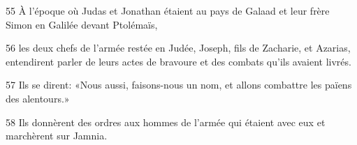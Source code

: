 55 À l’époque où Judas et Jonathan étaient au pays de Galaad et leur frère Simon en Galilée devant Ptolémaïs,

56 les deux chefs de l’armée restée en Judée, Joseph, fils de Zacharie, et Azarias, entendirent parler de leurs actes de bravoure et des combats qu’ils avaient livrés.

57 Ils se dirent: «Nous aussi, faisons-nous un nom, et allons combattre les païens des alentours.»

58 Ils donnèrent des ordres aux hommes de l’armée qui étaient avec eux et marchèrent sur Jamnia.
